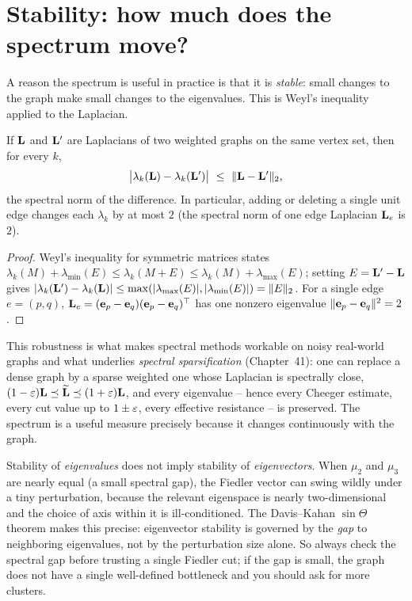 \section{Stability: how much does the spectrum move?}
\label{ch32:stability}

A reason the spectrum is useful in practice is that it is \emph{stable}: small changes to the graph make small changes to the eigenvalues. This is Weyl's inequality applied to the Laplacian.

\begin{proposition}
\label{ch32:weyl}
If $\mathbf{L}$ and $\mathbf{L}'$ are Laplacians of two weighted graphs on the same vertex set, then for every $k$,
\[
  \big|\lambda_k(\Lap)-\lambda_k(\Lap')\big|\ \le\ \norm{\Lap-\Lap'}_2,
\]
the spectral norm of the difference. In particular, adding or deleting a single unit edge changes each $\lambda_k$ by at most $2$ (the spectral norm of one edge Laplacian $\mathbf{L}_e$ is $2$).
\end{proposition}

\begin{proof}
Weyl's inequality for symmetric matrices states $\lambda_k(M)+\lambda_{\min}(E)\le\lambda_k(M+E)\le\lambda_k(M)+\lambda_{\max}(E)$; setting $E=\mathbf{L}'-\mathbf{L}$ gives $|\lambda_k(\mathbf{L}')-\lambda_k(\mathbf{L})|\le\max(|\lambda_{\max}(E)|,|\lambda_{\min}(E)|)=\lVert E\rVert_2$. For a single edge $e=(p,q)$, $\mathbf{L}_e=(\mathbf e_p-\mathbf e_q)(\mathbf e_p-\mathbf e_q)^\top$ has one nonzero eigenvalue $\lVert\mathbf e_p-\mathbf e_q\rVert^2=2$.
\end{proof}

This robustness is what makes spectral methods workable on noisy real-world graphs and what underlies \emph{spectral sparsification} (Chapter~41): one can replace a dense graph by a sparse weighted one whose Laplacian is spectrally close, $(1-\varepsilon)\mathbf{L}\preceq\widetilde{\mathbf{L}}\preceq(1+\varepsilon)\mathbf{L}$, and every eigenvalue -- hence every Cheeger estimate, every cut value up to $1\pm\varepsilon$, every effective resistance -- is preserved. The spectrum is a useful measure precisely because it changes continuously with the graph.

\begin{trapbox}
Stability of \emph{eigenvalues} does not imply stability of \emph{eigenvectors}. When $\mu_2$ and $\mu_3$ are nearly equal (a small spectral gap), the Fiedler vector can swing wildly under a tiny perturbation, because the relevant eigenspace is nearly two-dimensional and the choice of axis within it is ill-conditioned. The Davis--Kahan $\sin\Theta$ theorem makes this precise: eigenvector stability is governed by the \emph{gap} to neighboring eigenvalues, not by the perturbation size alone. So always check the spectral gap before trusting a single Fiedler cut; if the gap is small, the graph does not have a single well-defined bottleneck and you should ask for more clusters.
\end{trapbox}

